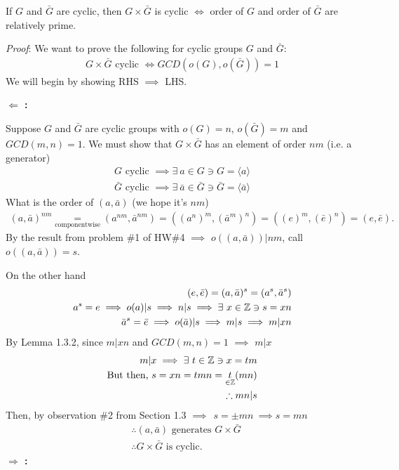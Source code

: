 \begin{proposition}
    If $G$ and $\bar{G}$ are cyclic, then $G\times \bar{G}$ is cyclic $\iff$ order of $G$ and order
    of $\bar{G}$ are relatively prime. \steezybreak

    \noindent \textit{Proof}: We want to prove the following for cyclic groups $G$ and $\bar{G}$:
    \begin{align}
        G\times\bar{G} \text{ cyclic } \iff GCD(o(G),o(\bar{G}))=1 \nonumber
    \end{align}
We will begin by showing RHS $\implies$ LHS. \steezybreak

\noindent \textbf{$\Leftarrow$ :} \steezybreak

\noindent Suppose $G$ and $\bar{G}$ are cyclic groups with $o(G)=n$, $o(\bar{G})=m$ and
$GCD(m,n)=1$. We must show that $G\times \bar{G}$ has an element of order $nm$ (i.e. a generator)
\begin{align}
    G \text{ cyclic }\implies \exists \ a \in G \ni G= \langle a \rangle \nonumber \\
    \bar{G} \text{ cyclic }\implies \exists \ \bar{a} \in \bar{G} \ni \bar{G}= \langle \bar{a} \rangle \nonumber
\end{align}
What is the order of $(a,\bar{a})$ (we hope it's $nm$)
\begin{align}
    (a,\bar{a})^{nm} \underset{\text{componentwise}}{=} (a^{nm},\bar{a}^{nm}) =((a^n)^m,(\bar{a}^m)^n) = ((e)^m,(\bar{e})^n)=(e,\bar{e}). \nonumber
\end{align}
By the result from problem \#1 of HW\#4 $\implies$ $o((a,\bar{a}))|nm$, call $o((a,\bar{a}))=s$.
\steezybreak

\begin{center}
\end{center}
On the other hand
\begin{align}
    (e,\bar{e})=(a,\bar{a})^s = (a^s,\bar{a}^s) \nonumber \\
    a^s= e \implies o(a)|s \implies n | s \implies \exists \ x \in {\mathbb{Z}} \ni s=xn \nonumber \\
    \bar{a}^s = \bar{e} \implies o(\bar{a})|s \implies m|s \implies m | xn \nonumber
\end{align}
By Lemma 1.3.2, since $m|xn$ and $GCD(m,n)=1$ $\implies$ $m|x$
\begin{align}
    m|x \implies \exists \ t\in {\mathbb{Z}} \ni x=tm \nonumber \\
\text{But then, } s=xn=tmn = \underset{\in {\mathbb{Z}}}{t}(mn) \nonumber \\
    \therefore mn|s \nonumber
\end{align}
Then, by observation \#2 from Section 1.3 $\implies \ \ s=\pm mn \ \implies s=mn$
\begin{align}
    &\therefore (a,\bar{a}) \text{ generates } G\times \bar{G} \nonumber \\
    &\therefore G\times \bar{G} \text{ is cyclic.} \nonumber
\end{align}
\noindent \textbf{$\Rightarrow$ :} \steezybreak


\end{proposition}
